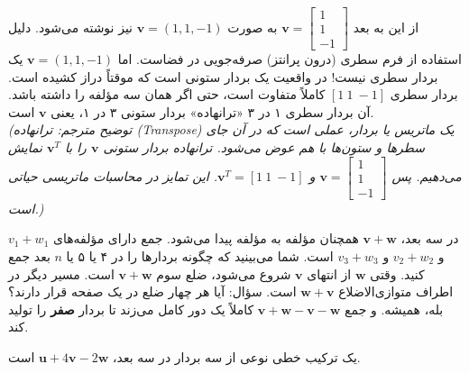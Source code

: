\documentclass[12pt, a4paper]{book}
\begin{document}
	از این به بعد $\mathbf{v} = \begin{bmatrix} 1 \\ 1 \\ -1 \end{bmatrix}$ به صورت $\mathbf{v} = (1, 1, -1)$ نیز نوشته می‌شود.
	دلیل استفاده از فرم سطری (درون پرانتز) صرفه‌جویی در فضاست. اما $\mathbf{v} = (1, 1, -1)$ یک بردار سطری نیست! در واقعیت یک بردار ستونی است که موقتاً دراز کشیده است. بردار سطری $[1 \ 1 \ -1]$ کاملاً متفاوت است، حتی اگر همان سه مؤلفه را داشته باشد. آن بردار سطری ۱ در ۳ «ترانهاده» بردار ستونی ۳ در ۱، یعنی $\mathbf{v}$ است. \\
	\textit{(توضیح مترجم: ترانهاده (Transpose) یک ماتریس یا بردار، عملی است که در آن جای سطرها و ستون‌ها با هم عوض می‌شود. ترانهاده بردار ستونی $\mathbf{v}$ را با $\mathbf{v}^T$ نمایش می‌دهیم. پس $\mathbf{v} = \begin{bmatrix} 1 \\ 1 \\ -1 \end{bmatrix}$ و $\mathbf{v}^T = [1 \ 1 \ -1]$. این تمایز در محاسبات ماتریسی حیاتی است.)}
	
	در سه بعد، $\mathbf{v} + \mathbf{w}$ همچنان مؤلفه به مؤلفه پیدا می‌شود. جمع دارای مؤلفه‌های $v_1+w_1$ و $v_2+w_2$ و $v_3+w_3$ است. شما می‌بینید که چگونه بردارها را در ۴ یا ۵ یا $n$ بعد جمع کنید. وقتی $\mathbf{w}$ از انتهای $\mathbf{v}$ شروع می‌شود، ضلع سوم $\mathbf{v} + \mathbf{w}$ است. مسیر دیگر در اطراف متوازی‌الاضلاع $\mathbf{w} + \mathbf{v}$ است. سؤال: آیا هر چهار ضلع در یک صفحه قرار دارند؟ بله، همیشه. و جمع $\mathbf{v} + \mathbf{w} - \mathbf{v} - \mathbf{w}$ کاملاً یک دور کامل می‌زند تا بردار \textbf{صفر} را تولید کند.
	
	یک ترکیب خطی نوعی از سه بردار در سه بعد، $\mathbf{u} + 4\mathbf{v} - 2\mathbf{w}$ است.
	
\end{document}
